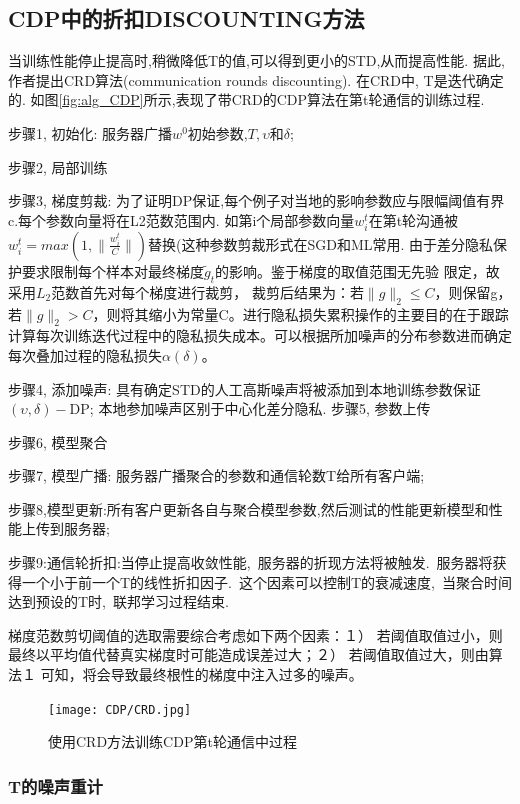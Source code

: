 \subsection{CDP中的折扣DISCOUNTING方法}

当训练性能停止提高时,稍微降低T的值,可以得到更小的STD,从而提高性能. 
据此,作者提出CRD算法(communication rounds discounting). 在CRD中, T是迭代确定的. 如图\ref{fig:alg_CDP}所示,表现了带CRD的CDP算法在第t轮通信的训练过程.

步骤1, 初始化: 服务器广播$w^0$初始参数,$T, \upsilon \text{和}\delta$;

步骤2, 局部训练

步骤3, 梯度剪裁: 为了证明DP保证,每个例子对当地的影响参数应与限幅阈值有界c.每个参数向量将在L2范数范围内. 如第i个局部参数向量$w^t_i$在第t轮沟通被$w^t_i=max(1, \|  \frac{w^t_i}{C}\|)$替换(这种参数剪裁形式在SGD和ML常用.
由于差分隐私保护要求限制每个样本对最终梯度$\tilde{g}_t$的影响。鉴于梯度的取值范围无先验
限定，故采用$L_2$范数首先对每个梯度进行裁剪， 
裁剪后结果为：若$\|g\|_2 \leq C$，则保留g，若$\|g \|_2 > C$，则将其缩小为常量C。进行隐私损失累积操作的主要目的在于跟踪计算每次训练迭代过程中的隐私损失成本。可以根据所加噪声的分布参数进而确定每次叠加过程的隐私损失$α(\delta)$。

步骤4, 添加噪声: 具有确定STD的人工高斯噪声将被添加到本地训练参数保证$(\upsilon,\delta)-\text{DP}$; 本地参加噪声区别于中心化差分隐私.
步骤5, 参数上传

步骤6, 模型聚合

步骤7, 模型广播: 服务器广播聚合的参数和通信轮数T给所有客户端;

步骤8,模型更新:所有客户更新各自与聚合模型参数,然后测试的性能更新模型和性能上传到服务器;

步骤9:通信轮折扣:当停止提高收敛性能, 服务器的折现方法将被触发. 服务器将获得一个小于前一个T的线性折扣因子. 这个因素可以控制T的衰减速度, 当聚合时间达到预设的T时, 联邦学习过程结束. 

  

梯度范数剪切阈值的选取需要综合考虑如下两个因素：１） 若阈值取值过小，则最终以平均值代替真实梯度时可能造成误差过大；２） 若阈值取值过大，则由算法１ 可知，将会导致最终根性的梯度中注入过多的噪声。
\begin{figure}[!ht]
    \centering
    \FloatBarrier
    \texttt{[image: CDP/CRD.jpg]}
    \caption{使用CRD方法训练CDP第t轮通信中过程}
    \label{CRD}

\end{figure}
 

\subsubsection{T的噪声重计}

